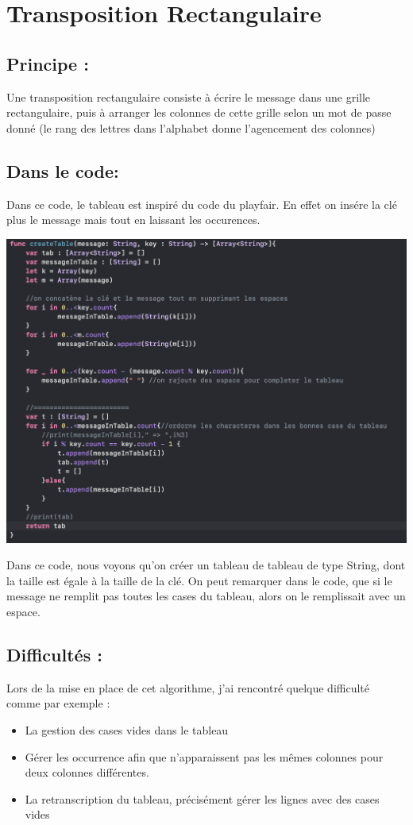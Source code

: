\documentclass{article}
\begin{document}
\section{Transposition Rectangulaire}
\subsection{Principe :}
Une transposition rectangulaire consiste à écrire le message dans une grille rectangulaire, puis à arranger les colonnes de cette grille selon un mot de passe donné (le rang des lettres dans l'alphabet donne l'agencement des colonnes)
\subsection{Dans le code:}
Dans ce code, le tableau est inspiré du code du playfair. En effet on insére la clé plus le message mais tout en laissant les occurences.
\begin{center}
\includegraphics[scale=0.5]{Transp.png}
\end{center}
Dans ce code, nous voyons qu'on créer un tableau de tableau de type String, dont la taille est égale à la taille de la clé. On peut remarquer dans le code, que si le message ne remplit pas toutes les cases du tableau, alors on le remplissait avec un espace.
\subsection{Difficultés :}
Lors de la mise en place de cet algorithme, j'ai rencontré quelque difficulté comme par exemple :
\begin{itemize}
\item La gestion des cases vides dans le tableau
\item Gérer les occurrence afin que n'apparaissent pas les mêmes colonnes pour deux colonnes différentes.
\item La retranscription du tableau, précisément gérer les lignes avec des cases vides
\end{itemize}
\end{document}
